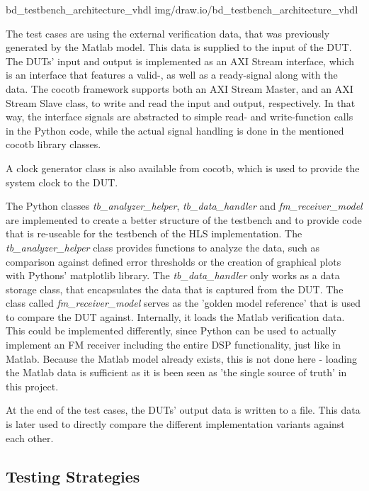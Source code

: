  {bd_testbench_architecture_vhdl} {img/draw.io/bd_testbench_architecture_vhdl}

The test cases are using the external verification data, that was previously generated by the Matlab model.
This data is supplied to the input of the DUT.
The DUTs' input and output is implemented as an AXI Stream interface, which is an interface that features a valid-, as well as a ready-signal along with the data.
The cocotb framework supports both an AXI Stream Master, and an AXI Stream Slave class, to write and read the input and output, respectively.
In that way, the interface signals are abstracted to simple read- and write-function calls in the Python code, while the actual signal handling is done in the mentioned cocotb library classes.

A clock generator class is also available from cocotb, which is used to provide the system clock to the DUT.

The Python classes \textit{tb\_analyzer\_helper}, \textit{tb\_data\_handler} and \textit{fm\_receiver\_model} are implemented to create a better structure of the testbench and to provide code that is re-useable for the testbench of the HLS implementation.
The \textit{tb\_analyzer\_helper} class provides functions to analyze the data, such as comparison against defined error thresholds or the creation of graphical plots with Pythons' matplotlib library.
The \textit{tb\_data\_handler} only works as a data storage class, that encapsulates the data that is captured from the DUT.
The class called \textit{fm\_receiver\_model} serves as the 'golden model reference' that is used to compare the DUT against.
Internally, it loads the Matlab verification data.
This could be implemented differently, since Python can be used to actually implement an FM receiver including the entire DSP functionality, just like in Matlab.
Because the Matlab model already exists, this is not done here - loading the Matlab data is sufficient as it is been seen as 'the single source of truth' in this project.

At the end of the test cases, the DUTs' output data is written to a file.
This data is later used to directly compare the different implementation variants against each other.

\subsection{Testing Strategies}

